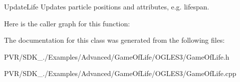   Update\+Life  Updates particle positions and attributes, e.\+g. lifespan. 

Here is the caller graph for this function\+:




The documentation for this class was generated from the following files\+:\begin{DoxyCompactItemize}
\item 
P\+V\+R/\+S\+D\+K\+\_./\+Examples/\+Advanced/\+Game\+Of\+Life/\+O\+G\+L\+E\+S3/Game\+Of\+Life.\+h\item 
P\+V\+R/\+S\+D\+K\+\_./\+Examples/\+Advanced/\+Game\+Of\+Life/\+O\+G\+L\+E\+S3/Game\+Of\+Life.\+cpp\end{DoxyCompactItemize}
